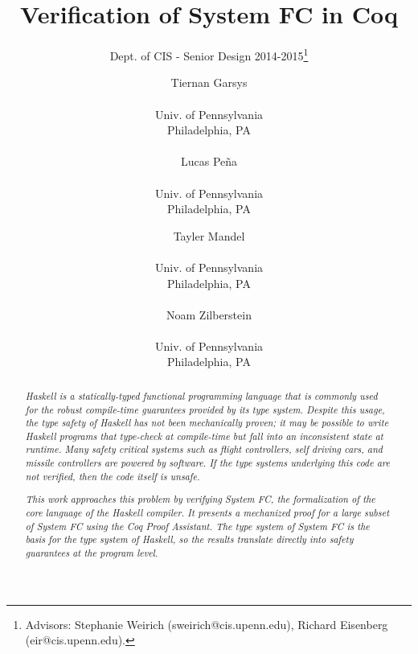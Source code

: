 \documentclass{sig-alternate}
\begin{document}
 


\title{Verification of System FC in Coq}
\subtitle{Dept. of CIS - Senior Design 2014-2015\thanks{Advisors: Stephanie Weirich (sweirich@cis.upenn.edu), Richard Eisenberg (eir@cis.upenn.edu).}}
\author{
  Tiernan Garsys \\  \\ Univ. of Pennsylvania \\ Philadelphia, PA\\\\
  Lucas Pe\~{n}a \\  \\ Univ. of Pennsylvania \\ Philadelphia, PA
  \and
  Tayler Mandel \\  \\ Univ. of Pennsylvania \\ Philadelphia, PA\\\\
  Noam Zilberstein \\  \\ Univ. of Pennsylvania \\ Philadelphia, PA
}
\date{}
\maketitle

\begin{abstract}
\textit{
Haskell is a statically-typed functional programming language that is commonly used for the robust compile-time guarantees provided by its type system. Despite this usage, the type safety of Haskell has not been mechanically proven; it may be possible to write Haskell programs that type-check at compile-time but fall into an inconsistent state at runtime. Many safety critical systems such as flight controllers, self driving cars, and missile controllers are powered by software. If the type systems underlying this code are not verified, then the code itself is unsafe.
}

\textit{
This work approaches this problem by verifying System FC, the formalization of the core language of the Haskell compiler. It presents a mechanized proof for a large subset of System FC using the Coq Proof Assistant.  The type system of System FC is the basis for the type system of Haskell, so the results translate directly into safety guarantees at the program level.
}
\end{abstract}
\end{document}
